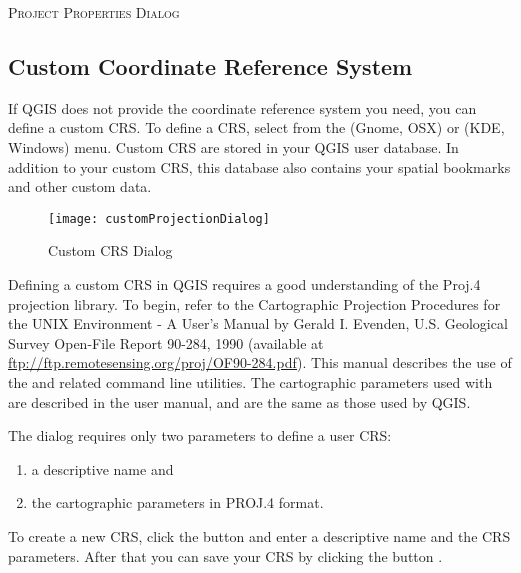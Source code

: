 \begin{Tip}
\caption{\textsc{Project Properties Dialog}}
\end{Tip}

\subsection{Custom Coordinate Reference System}\label{sec:customprojections}

If QGIS does not provide the coordinate reference system you need, you
can define a custom CRS. To define a CRS, select
 from the  
(Gnome, OSX) or  (KDE, Windows) menu.
Custom CRS are stored in your QGIS user database. In addition to your custom
CRS, this database also contains your spatial bookmarks and other custom data. 

\begin{figure}[ht]
   \begin{center}
   \caption{Custom CRS Dialog \nixcaption}\label{fig:customprojections}\smallskip
   \texttt{[image: customProjectionDialog]}
\end{center}  
\end{figure}

Defining a custom CRS in QGIS requires a good understanding of the Proj.4
projection library. To begin, refer to the Cartographic Projection Procedures
for the UNIX Environment - A User's Manual by Gerald I. Evenden, U.S.
Geological Survey Open-File Report 90-284, 1990 (available at \url{ftp://ftp.remotesensing.org/proj/OF90-284.pdf}).
This manual describes the use of the  and related command line
utilities. The cartographic parameters used with  are
described in the user manual, and are the same as those used by QGIS. 

The  dialog requires
only two parameters to define a user CRS: 
\begin{enumerate}
\item a descriptive name and
\item the cartographic parameters in PROJ.4 format.
\end{enumerate}
To create a new CRS, click the  button and enter a
descriptive name and the CRS parameters. After that you can save your CRS by
clicking the button .

